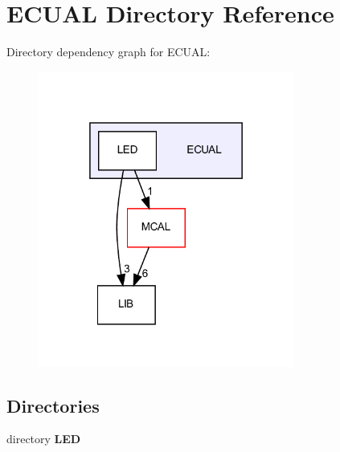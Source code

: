 \section{E\+C\+U\+AL Directory Reference}
\label{dir_7a24211e379eb12231b69ead3b543b84}
Directory dependency graph for E\+C\+U\+AL\+:\nopagebreak
\begin{figure}[H]
\begin{center}
\leavevmode
\includegraphics[width=238pt]{dir_7a24211e379eb12231b69ead3b543b84_dep}
\end{center}
\end{figure}
\subsection*{Directories}
\begin{DoxyCompactItemize}
\item 
directory \textbf{ L\+ED}
\end{DoxyCompactItemize}
